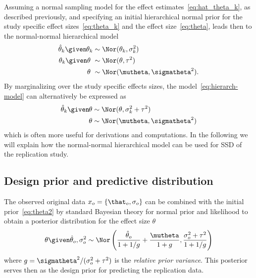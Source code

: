 Assuming a normal sampling model for the effect
estimates~\eqref{eq:hat_theta_k}, as described previously, and specifying an
initial hierarchical normal prior for the study specific effect
sizes~\eqref{eq:theta_k} and the effect size~\eqref{eq:theta}, leads then to the
normal-normal hierarchical model
\begin{subequations}
\label{eq:hierarch-model}
\begin{align}
  \hat{\theta}_k \given \mspace{-1mu} \theta_k &\sim \Nor(\theta_k, \sigma_k^2)
  \label{eq:hat_theta_k} \\
  \theta_k \given \theta \,\,  &\sim \Nor(\theta, \tau^2) \label{eq:theta_k} \\
  \theta \,\, &\sim \Nor(\mutheta,
  \sigmatheta^2). \label{eq:theta}
\end{align}
\end{subequations}
By marginalizing over the study specific effects sizes, the
model~\eqref{eq:hierarch-model} can alternatively be expressed as
\begin{subequations}
\label{eq:hierarch-model2}
\begin{align}
  \hat{\theta}_k \given \mspace{-1mu} \theta &\sim \Nor(\theta, \sigma_k^2 + \tau^{2})
  \label{eq:hat_theta_k2} \\
  \theta  &\sim \Nor(\mutheta,
  \sigmatheta^2) \label{eq:theta2}
\end{align}
\end{subequations}
which is often more useful for derivations and computations. In the following we
will explain how the normal-normal hierarchical model can be used
for SSD of the replication study.

\subsection{Design prior and predictive distribution}
\label{sec:designpredictive}
The observed original data $x_{o} = \{\that_{o}, \sigma_{o}\}$ can be combined
with the initial prior~\eqref{eq:theta2} %
by standard Bayesian theory for normal prior and likelihood \citep[ch.
3.7]{Spiegelhalter2004} to obtain a posterior distribution for the effect size
$\theta$
\begin{align}
  \label{eq:dpnormal}
  \theta \given \hat{\theta}_o, \sigma^2_o
  \sim
  \Nor\left(
  \frac{\hat{\theta}_o}{1 + 1/g} + \frac{\mutheta}{1 + g},
  \frac{\sigma^2_o + \tau^2}{1 + 1/g} \right)
\end{align}
where $g = \sigmatheta^2/(\sigma^2_o + \tau^2)$ is the \emph{relative prior
  variance}. This posterior serves then as the design prior for predicting the
replication data.

